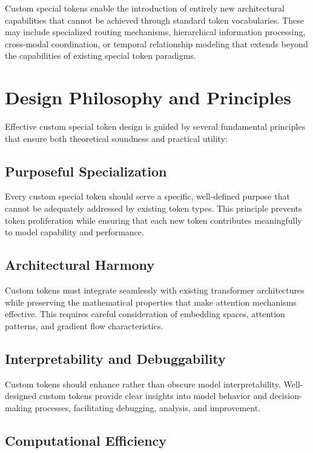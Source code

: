 Custom special tokens enable the introduction of entirely new architectural capabilities that cannot be achieved through standard token vocabularies. These may include specialized routing mechanisms, hierarchical information processing, cross-modal coordination, or temporal relationship modeling that extends beyond the capabilities of existing special token paradigms.

\section{Design Philosophy and Principles}

Effective custom special token design is guided by several fundamental principles that ensure both theoretical soundness and practical utility:

\subsection{Purposeful Specialization}

Every custom special token should serve a specific, well-defined purpose that cannot be adequately addressed by existing token types. This principle prevents token proliferation while ensuring that each new token contributes meaningfully to model capability and performance.

\subsection{Architectural Harmony}

Custom tokens must integrate seamlessly with existing transformer architectures while preserving the mathematical properties that make attention mechanisms effective. This requires careful consideration of embedding spaces, attention patterns, and gradient flow characteristics.

\subsection{Interpretability and Debuggability}

Custom tokens should enhance rather than obscure model interpretability. Well-designed custom tokens provide clear insights into model behavior and decision-making processes, facilitating debugging, analysis, and improvement.

\subsection{Computational Efficiency}

